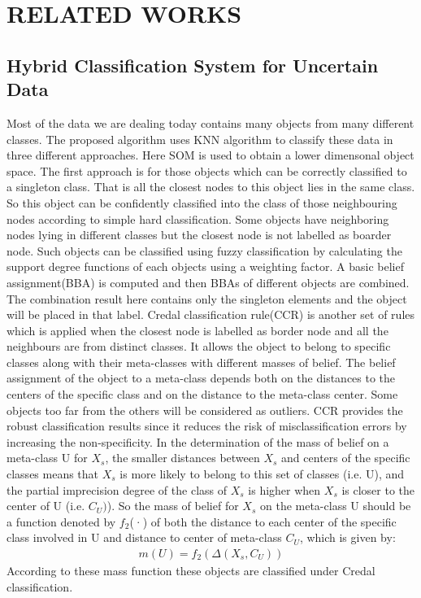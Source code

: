 \documentclass[10pt,a4paper,journal]{IEEEtran}
\begin{document}
\section{RELATED WORKS}
\subsection{Hybrid Classification System for Uncertain Data}
\hspace{2em}
Most of the data we are dealing today contains many objects from many different classes. The proposed algorithm \cite{1} uses KNN algorithm\cite{2} to classify these data in three different approaches. Here SOM is used to obtain a lower dimensonal object space\cite{3}. The first approach is for those objects which can be correctly classified to a singleton class. That is all the closest nodes to this object lies in the same class. So this object can be confidently classified into the class of those neighbouring nodes according to simple hard classification. Some objects have neighboring nodes lying in different classes but the closest node is not labelled as boarder node. Such objects can be classified using fuzzy classification by calculating the support degree functions of each objects using a weighting factor. A basic belief assignment(BBA) is computed and then BBAs of different objects are combined. The combination result here contains only the singleton elements and the object will be placed in that label. Credal classification rule(CCR) is another set of rules which is applied when the closest node is labelled as border node and all the neighbours are from distinct classes. It allows the object to belong to specific classes along with their meta-classes with different masses of belief. The belief assignment of the object to a meta-class depends both on the distances to the centers of the specific class and on the distance to the meta-class center. Some objects too far from the others will be considered as outliers. CCR provides the robust classification results since it reduces the risk of misclassification errors by increasing the non-specificity. In the determination of the mass of belief on a meta-class U for $X_{s}$, the smaller distances between $X_{s}$ and centers of the specific classes means that $X_{s}$ is more likely to belong to this set of classes (i.e. U), and the partial imprecision degree of the class of $X_{s}$ is higher when $X_{s}$ is closer to the center of U (i.e. $C_{U})$). So the mass of belief for $X_{s}$ on the meta-class U should be a function denoted by $f_{2}$(·) of both the distance to each center of the specific class involved in U and distance to center of meta-class $C_{U}$, which is given by:
\begin{eqnarray}
m(U) = f_{2}(\Delta(X_{s}, C_{U}))
\end{eqnarray}
According to these mass function these objects are classified under Credal classification.\\
\end{document}
